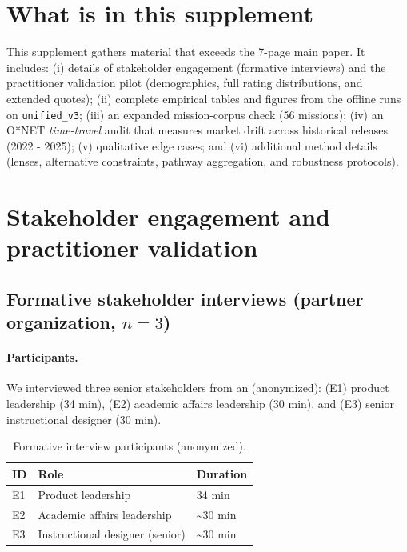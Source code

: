 \renewcommand{\thetable}{S\arabic{table}}
\renewcommand{\thefigure}{S\arabic{figure}}
\setcounter{table}{0}
\setcounter{figure}{0}


\section{What is in this supplement}
This supplement gathers material that exceeds the 7-page main paper. It includes:
(i) details of stakeholder engagement (formative interviews) and the practitioner validation pilot (demographics, full rating distributions, and extended quotes);
(ii) complete empirical tables and figures from the offline runs on \texttt{unified\_v3};
(iii) an expanded mission-corpus check (56 missions);
(iv) an O*NET \emph{time-travel} audit that measures market drift across historical releases (2022 - 2025);
(v) qualitative edge cases; and
(vi) additional method details (lenses, alternative constraints, pathway aggregation, and robustness protocols).


\section{Stakeholder engagement and practitioner validation}
\label{sec:supp-stakeholder}

\subsection{Formative stakeholder interviews (partner organization, $n{=}3$)}
\paragraph{Participants.} We interviewed three senior stakeholders from an \IndustryPartner (anonymized):
(E1) product leadership (34 min),
(E2) academic affairs leadership (30 min), and
(E3) senior instructional designer (30 min).

\begin{table}[h]
\centering
\small
\caption{Formative interview participants (anonymized).}
\label{tab:expert-participants}
\begin{tabular}{@{}lll@{}}
\toprule
ID & Role & Duration\\
\midrule
E1 & Product leadership & 34 min\\
E2 & Academic affairs leadership & \textasciitilde 30 min\\
E3 & Instructional designer (senior) & \textasciitilde 30 min\\
\bottomrule
\end{tabular}
\end{table}

